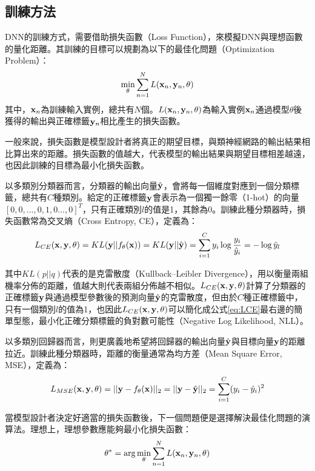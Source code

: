 \subsection{訓練方法}
DNN的訓練方式，需要借助損失函數（Loss Function），來模擬DNN與理想函數的量化距離。其訓練的目標可以規劃為以下的最佳化問題（Optimization Problem）：
\begin{equation}
\min_{\theta}{ \sum_{n=1}^{N}{ {L( \bold{x}_n , \bold{y}_n , \theta)}}}
\end{equation}
其中，$\bold{x}_n$為訓練輸入實例，總共有$N$個。$L(\bold{x}_n , \bold{y}_n, \theta)$為輸入實例$\bold{x}_n$通過模型$\theta$後獲得的輸出與正確標籤$\bold{y}_n$相比產生的損失函數。

一般來說，損失函數是模型設計者將真正的期望目標，與類神經網路的輸出結果相比算出來的距離。損失函數的值越大，代表模型的輸出結果與期望目標相差越遠，也因此訓練的目標為最小化損失函數。

以多類別分類器而言，分類器的輸出向量$\hat{\bold{y}}$，會將每一個維度對應到一個分類標籤，總共有$C$種類別。給定的正確標籤$\bold{y}$會表示為一個獨一餘零（1-hot）的向量$[0 , 0 , ... , 0 , 1 , 0 ... , 0]^T $，只有正確類別$l$的值是1，其餘為0。訓練此種分類器時，損失函數常為交叉熵（Cross Entropy, CE），定義為：
\begin{equation} \label{eq:LCE}
L_{CE}(\bold{x} , \bold{y} , \theta) = KL( \bold{y} || f_{\theta}(\bold{x}) ) = KL(\bold{y} || \hat{\bold{y} }) = \sum_{i = 1}^{C} y_i \log{ \frac{y_i}{\hat{y}_i} } = - \log \hat{y}_{l} 
\end{equation}

其中$KL(p||q)$代表的是克雷散度（Kullback–Leibler Divergence），用以衡量兩組機率分佈的距離，值越大則代表兩組分佈越不相似。$L_{CE}(\bold{x} , \bold{y} , \theta) $計算了分類器的正確標籤$\bold{y}$與通過模型參數後的預測向量$\hat{\bold{y}}$的克雷散度，但由於$C$種正確標籤中，只有一個類別$l$的值為1，也因此$L_{CE}(\bold{x} , \bold{y} , \theta) $可以簡化成公式\ref{eq:LCE}最右邊的簡單型態，最小化正確分類標籤的負對數可能性（Negative Log Likelihood, NLL）。

以多類別回歸器而言，則更廣義地希望將回歸器的輸出向量$\hat{\bold{y}}$與目標向量$\bold{y}$的距離拉近。訓練此種分類器時，距離的衡量通常為均方差（Mean Square Error, MSE），定義為：
\begin{equation}
L_{MSE}(\bold{x} , \bold{y} , \theta) = || \bold{y} - f_{\theta}(\bold{x}) ||_2 = || \bold{y} - \hat{\bold{y}} ||_2 = \sum_{i = 1}^{C} ( y_i - \hat{y}_i )^2 
\end{equation}

當模型設計者決定好適當的損失函數後，下一個問題便是選擇解決最佳化問題的演算法。理想上，理想參數應能夠最小化損失函數：
\begin{equation}
\theta^* = \arg\min_{\theta}{ \sum_{n=1}^{N}{ {L( \bold{x}_n , \bold{y}_n , \theta)}}}
\end{equation}

